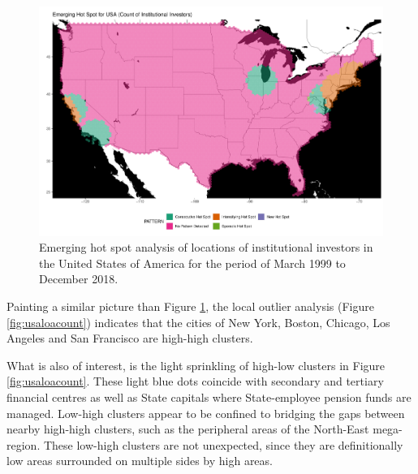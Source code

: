 \begin{figure}[h]
	\centering
	\includegraphics[width=1\linewidth]{Figures/ChapterIV/USA_Count_EH}
	\caption[Emerging Hot Spot Analysis of Locations of Institutional Investors in the USA 1999-2018]{Emerging hot spot analysis of locations of institutional investors in the United States of America for the period of March 1999 to December 2018.}
	\label{fig:usahspcount}
\end{figure}

Painting a similar picture than Figure \ref{fig:usahspcount},  the local outlier analysis (Figure \ref{fig:usaloacount}) indicates that the cities of New York, Boston, Chicago, Los Angeles and San Francisco are high-high clusters.  

What is also of interest, is the light sprinkling of high-low clusters in Figure \ref{fig:usaloacount}.  These light blue dots coincide with secondary and tertiary financial centres as well as State capitals where State-employee pension funds are managed.  
Low-high clusters appear to be confined to bridging the gaps between nearby high-high clusters, such as the peripheral areas of the North-East mega-region.  These low-high clusters are not unexpected, since they are definitionally low areas surrounded on multiple sides by high areas.     


